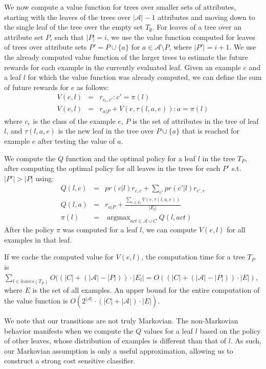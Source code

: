\documentclass[letterpaper]{article}
\DeclareMathOperator*{\argmax}{argmax}
\theoremstyle{definition}
\begin{document}
We now compute a value function for trees over smaller sets of attributes, starting with the leaves of the trees over $|\mathcal{A}|-1$ attributes and moving down to the single leaf of the tree over the empty set $T_{\emptyset}$. 
For leaves of a tree over an attribute set $P$, such that $|P|=i$, we use the value function computed for leaves of trees over attribute sets $P' = P \cup \{a\}$ for $a \in \mathcal{A}\setminus P$, where $|P'| = i+1$.
We use the already computed value function of the larger trees to estimate the future rewards for each example in the currently evaluated leaf. Given an example $e$ and a leaf $l$ for which the value function was already computed, we can define the sum of future rewards for $e$ as follows:
{\footnotesize
\begin{eqnarray}
\label{eqn:vel}
V(e,l) &=& r_{c_e,c'}  :  c' = \pi(l) \\
V(e,l) &=& r_{a|P} + V(e,\tau(l,a,e))  :  a = \pi(l) 
\end{eqnarray}
}
where $c_e$ is the class of the example $e$, $P$ is the set of attributes in the tree of leaf $l$, and $\tau(l,a,e)$ is the new leaf in the tree over $P \cup \{a\}$ that is reached for example $e$ after testing the value of $a$. 

We compute the $Q$ function and the optimal policy for a leaf $l$ in the tree $T_P$, after computing the optimal policy for all leaves in the trees for each $P'$ s.t. $|P'|>|P|$ using:
{\footnotesize
\begin{eqnarray}
Q(l,c) &=& pr(c|l)r_{c,c} + \sum_{c'}pr(c'|l)r_{c',c}\\
\label{eqn:qla}
Q(l,a) &=& r_{a|P} + \frac{\sum_{e \in E_l} V(e,\tau(l,a,e))}{|E_l|}\\
\label{eqn:pi}
\pi(l) &=& \argmax_{act \in \mathcal{A} \cup C} Q(l,act)
\end{eqnarray}
}
After the policy $\pi$ was computed for a leaf $l$, we can compute $V(e,l)$ for all examples in that leaf.




If we cache the computed value for $V(e,l)$, the computation time for a tree $T_P$ is $\sum_{l \in leaves(T_P)} O((|C| + (|\mathcal{A}| - |P|))\cdot |E_l| = O((|C| + (|\mathcal{A}| - |P|))\cdot |E|)$, where $E$ is the set of all examples. An  upper bound for the entire computation of the value function is $O(2^{|\mathcal{A}|} \cdot (|C| + |\mathcal{A}|)\cdot |E|)$.


We note that our transitions are not truly Markovian. The non-Markovian behavior manifests when we compute the $Q$ values for a leaf $l$ based on the policy of other leaves, whose distribution of examples is different than that of $l$. As such, our Markovian assumption is only a useful approximation, allowing us to construct a strong cost sensitive classifier.
\end{document}
